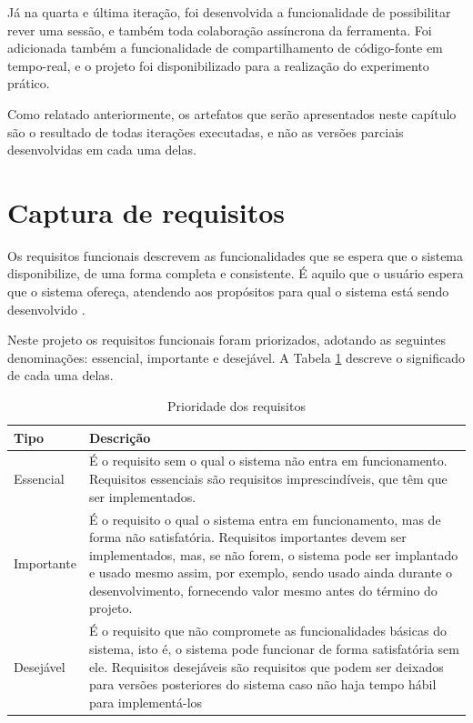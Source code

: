 Já na quarta e última iteração, foi desenvolvida a funcionalidade de possibilitar rever uma sessão, e também toda colaboração assíncrona da ferramenta. Foi adicionada também a funcionalidade de compartilhamento de código-fonte em tempo-real, e o projeto foi disponibilizado para a realização do experimento prático.

Como relatado anteriormente, os artefatos que serão apresentados neste capítulo são o resultado de todas iterações executadas, e não as versões parciais desenvolvidas em cada uma delas.

\section{Captura de requisitos}

Os requisitos funcionais descrevem as funcionalidades que se espera que o sistema disponibilize, de uma forma completa e consistente. É aquilo que o usuário espera que o sistema ofereça, atendendo aos propósitos para qual o sistema está sendo desenvolvido \cite{padua05}.

Neste projeto os requisitos funcionais foram priorizados, adotando as seguintes denominações: essencial, importante e desejável. A Tabela \ref{tab:prioridade_req} descreve o significado de cada uma delas.

\bgroup
\def\arraystretch{1.5} %
\begin{table}[h]{} %
\caption{Prioridade dos requisitos}
\centering
\begin{tabular}{ | p{3cm} | p{10cm}| } \hline
\textbf{Tipo} & \textbf{Descrição} \\ \hline
Essencial & É o requisito sem o qual o sistema não entra em funcionamento. Requisitos essenciais são requisitos imprescindíveis, que têm que ser implementados.  \\ \hline
Importante  & É o requisito o qual o sistema entra em funcionamento, mas de forma não satisfatória. Requisitos importantes devem ser implementados, mas, se não forem, o sistema pode ser implantado e usado mesmo assim, por exemplo, sendo usado ainda durante o desenvolvimento, fornecendo valor mesmo antes do término do projeto.  \\ \hline
Desejável  & É o requisito que não compromete as funcionalidades básicas do sistema, isto é, o sistema pode funcionar de forma satisfatória sem ele. Requisitos desejáveis são requisitos que podem ser deixados para versões posteriores do sistema caso não haja tempo hábil para implementá-los  \\ \hline
\end{tabular}
\label{tab:prioridade_req}
\end{table}
\egroup

